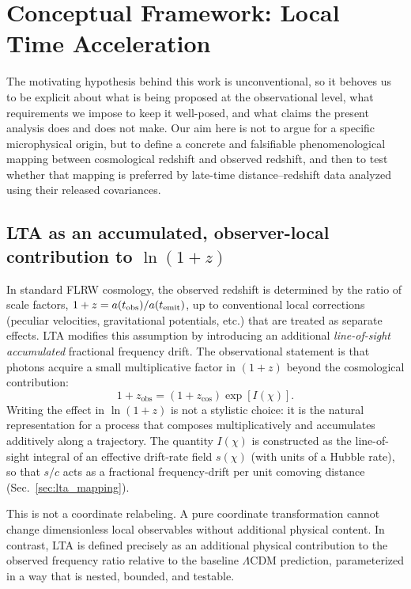 \documentclass[10pt]{article}
\newcommand{\zobs}{z_{\mathrm{obs}}}
\newcommand{\zcos}{z_{\mathrm{cos}}}
\begin{document}
\section{Conceptual Framework: Local Time Acceleration}
\label{sec:concept}

The motivating hypothesis behind this work is unconventional, so it behoves us to be explicit about
what is being proposed at the observational level, what requirements we impose to keep it
well-posed, and what claims the present analysis does and does not make.
Our aim here is not to argue for a specific microphysical origin, but to define a concrete and
falsifiable phenomenological mapping between cosmological redshift and observed redshift, and then
to test whether that mapping is preferred by late-time distance--redshift data analyzed using their
released covariances.

\subsection{LTA as an accumulated, observer-local contribution to $\ln(1+z)$}

In standard FLRW cosmology, the observed redshift is determined by the ratio of scale factors,
$1+z = a(t_{\rm obs})/a(t_{\rm emit})$, up to conventional local corrections (peculiar velocities,
gravitational potentials, etc.) that are treated as separate effects.
LTA modifies this assumption by introducing an additional \emph{line-of-sight accumulated} fractional
frequency drift. The observational statement is that photons acquire a small multiplicative factor
in $(1+z)$ beyond the cosmological contribution:
\begin{equation}
1+\zobs = (1+\zcos)\exp[I(\chi)].
\end{equation}
Writing the effect in $\ln(1+z)$ is not a stylistic choice: it is the natural representation for a
process that composes multiplicatively and accumulates additively along a trajectory.
The quantity $I(\chi)$ is constructed as the line-of-sight integral of an effective drift-rate
field $s(\chi)$ (with units of a Hubble rate), so that $s/c$ acts as a fractional frequency-drift
per unit comoving distance (Sec.~\ref{sec:lta_mapping}).

This is not a coordinate relabeling.
A pure coordinate transformation cannot change dimensionless local observables without additional
physical content.
In contrast, LTA is defined precisely as an additional physical contribution to the observed
frequency ratio relative to the baseline $\Lambda$CDM prediction, parameterized in a way that is
nested, bounded, and testable.
\end{document}
